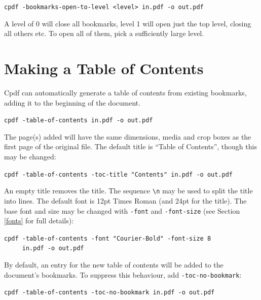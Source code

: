 \documentclass{book}
\begin{document}
  \begin{framed}
   \noindent\small\verb!cpdf -bookmarks-open-to-level <level> in.pdf -o out.pdf!
  \end{framed}

\noindent A level of 0 will close all bookmarks, level 1 will open just the top level, closing all others etc. To open all of them, pick a sufficiently large level.


\section{Making a Table of Contents}

Cpdf can automatically generate a table of contents from existing bookmarks, adding it to the beginning of the document.

  \begin{framed}
   \noindent\small\verb!cpdf -table-of-contents in.pdf -o out.pdf!
  \end{framed}

\noindent The page(s) added will have the same dimensions, media and crop boxes as the first page of the original file. The default title is ``Table of Contents'', though this may be changed:

  \begin{framed}
   \noindent\small\verb!cpdf -table-of-contents -toc-title "Contents" in.pdf -o out.pdf!
  \end{framed}

\noindent An empty title removes the title. The sequence \texttt{\textbackslash n} may be used to split the title into lines. The default font is 12pt Times Roman (and 24pt for the title). The base font and size may be changed with \texttt{-font} and \texttt{-font-size} (see Section \ref{fonts} for full details):

  \begin{framed}
   \noindent\small\verb!cpdf -table-of-contents -font "Courier-Bold" -font-size 8!\\
   \noindent\small\verb!     in.pdf -o out.pdf!
  \end{framed}

\noindent By default, an entry for the new table of contents will be added to the document's bookmarks. To suppress this behaviour, add \texttt{-toc-no-bookmark}:

  \begin{framed}
   \noindent\small\verb!cpdf -table-of-contents -toc-no-bookmark in.pdf -o out.pdf!
  \end{framed}
\end{document}
